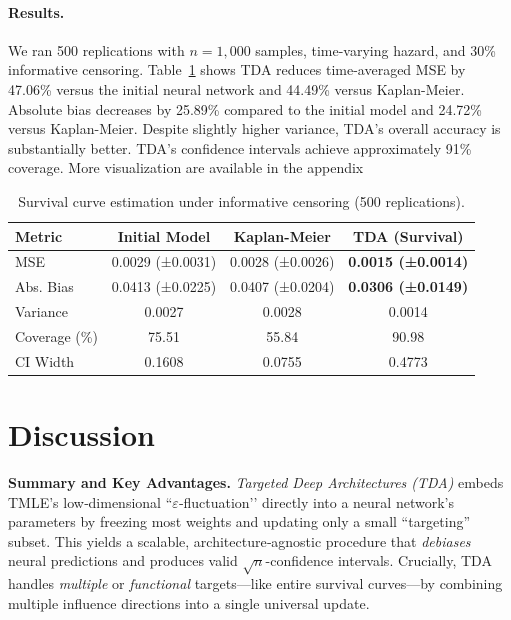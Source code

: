 \documentclass{article}
\theoremstyle{remark}
\begin{document}
\paragraph{Results.}
We ran 500 replications with $n=1{,}000$ samples, time-varying hazard, and 30\% informative censoring. Table~\ref{table:survival} shows TDA reduces time-averaged MSE by 47.06\% versus the initial neural network and 44.49\% versus Kaplan-Meier. Absolute bias decreases by 25.89\% compared to the initial model and 24.72\% versus Kaplan-Meier. Despite slightly higher variance, TDA's overall accuracy is substantially better. TDA's confidence intervals achieve approximately 91\% coverage. More visualization are available in the appendix 

\begin{table}[h!]
\centering
\caption{Survival curve estimation under informative censoring (500 replications).}
\label{table:survival}
\begin{tabular}{lccc}
\toprule
Metric & Initial Model & Kaplan-Meier & TDA (Survival) \\
\midrule
MSE     & 0.0029 (±0.0031)  & 0.0028 (±0.0026)  & \textbf{0.0015 (±0.0014)} \\
Abs. Bias  & 0.0413 (±0.0225)  & 0.0407 (±0.0204)  & \textbf{0.0306 (±0.0149)} \\
Variance       & 0.0027  & 0.0028   & 0.0014  \\
\midrule
Coverage (\%) & 75.51 & 55.84 & 90.98 \\
CI Width       &  0.1608  & 0.0755   & 0.4773  \\
\bottomrule
\end{tabular}
\end{table}


\section{Discussion}
\label{sec:discussion}

\noindent\textbf{Summary and Key Advantages.}
\emph{Targeted Deep Architectures (TDA)} embeds TMLE’s low‐dimensional ``$\varepsilon$‐fluctuation’’ directly into a neural network’s parameters by freezing most weights and updating only a small “targeting” subset. This yields a scalable, architecture‐agnostic procedure that \emph{debiases} neural predictions and produces valid \(\sqrt{n}\)-confidence intervals. Crucially, TDA handles \emph{multiple} or \emph{functional} targets—like entire survival curves—by combining multiple influence directions into a single universal update.
\end{document}
